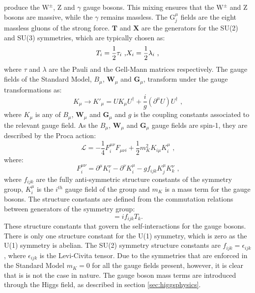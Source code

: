 %
\noindent produce the $\text{W}^{\pm}$, Z and $\gamma$ gauge bosons.  This mixing ensures that the $\text{W}^{\pm}$ and Z bosons are massive, while the $\gamma$ remains massless.  The $\text{G}^{\mu}_{j}$ fields are the eight massless gluons of the strong force.   $\textbf{T}$ and $\textbf{X}$ are the generators for the SU(2) and SU(3) symmetries, which are typically chosen as:
%
\begin{equation}
T_{i} = \frac{1}{2}\tau_{i} \text{ ,} \\
X_{i} = \frac{1}{2}\lambda_{i} \text{ ,} \\
\end{equation}
%
\noindent where $\tau$ and $\lambda$ are the Pauli and the Gell-Mann matrices respectively.  The gauge fields of the Standard Model, $B_{\mu}$, $\textbf{W}_{\mu}$ and $\textbf{G}_{\mu}$, transform under the gauge transformations as:
%
\begin{equation}
K_{\mu} \rightarrow K'_{\mu} = UK_{\mu}U^{\dagger} + \frac{i}{g}(\partial^{\mu}U)U^{\dagger} \text{ ,} 
\end{equation}
%
\noindent where $K_{\mu}$ is any of $B_{\mu}$, $\textbf{W}_{\mu}$ and $\textbf{G}_{\mu}$ and $g$ is the coupling constants associated to the relevant gauge field.  As the $B_{\mu}$, $\textbf{W}_{\mu}$ and $\textbf{G}_{\mu}$ gauge fields are spin-1, they are described by the Proca action:
%
\begin{equation}
\mathcal{L} = -\frac{1}{4}F^{{\mu}{\nu}}_{i}F_{{\mu}{\nu}{i}} + \frac{1}{2}m_{K}^{2}K_{i\mu}K^{\mu}_{i} \text{ ,} 
\end{equation}
%
\noindent where:
%
\begin{equation}
F^{{\mu}{\nu}}_{i} = \partial^{\mu}K^{\nu}_{i} - \partial^{\nu}K^{\mu}_{i} - gf_{ijk}K^{\mu}_{j}K^{\nu}_{k} \text{ ,} 
\end{equation}
%
\noindent where $f_{ijk}$ are the fully anti-symmetric structure constants of the symmetry group, $K^{\mu}_{i}$ is the $i^{th}$ gauge field of the group and $m_{K}$ is a mass term for the gauge bosons.  The structure constants are defined from the commutation relations between generators of the symmetry group:
%
\begin{equation}
[T_{i},T_{j}] = if_{ijk}T_{k} \text{.} 
\end{equation}
%
\noindent These structure constants that govern the self-interactions for the gauge bosons.  There is only one structure constant for the U(1) symmetry, which is zero as the U(1) symmetry is abelian.  The SU(2) symmetry structure constants are $f_{ijk} = \epsilon_{ijk}$, where $\epsilon_{ijk}$ is the Levi-Civita tensor.  Due to the symmetries that are enforced in the Standard Model $m_{K} = 0$ for all the gauge fields present, however, it is clear that is is not the case in nature.  The gauge boson mass terms are introduced through the Higgs field, as described in section \ref{sec:higgsphysics}. 

